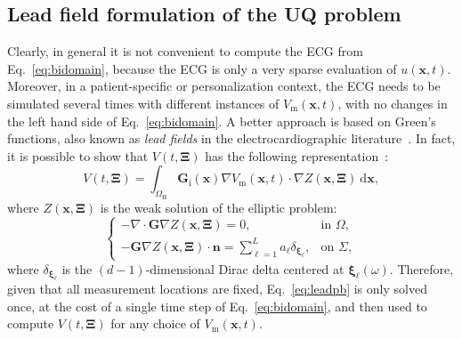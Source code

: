 \documentclass[runningheads]{llncs}
\newcommand{\bs}[1]{\boldsymbol{#1}}
\newcommand{\Vm}{V_\mathrm{m}}
\newcommand{\vx}{\mathbf{x}}
\newcommand{\vn}{\mathbf{n}}
\newcommand{\tG}{\mathbf{G}}
\newcommand{\tGi}{\tG_\mathrm{i}}
\newcommand{\R}{\mathbb{R}}
\newcommand{\dd}{\mathrm{d}}
\newcommand{\OmegaH}{\Omega_\mathrm{H}}
\begin{document}
\subsection{Lead field formulation of the UQ problem}
Clearly, in general it is not convenient to compute the ECG from Eq.~\eqref{eq:bidomain},
because the ECG is only a very sparse evaluation of $u(\vx,t)$.  Moreover, in
a patient-specific or personalization context, the ECG needs to be simulated
several times with different instances of $\Vm(\vx,t)$, with no changes in the
left hand side of Eq.~\eqref{eq:bidomain}. A better approach is based on
Green's functions, also known as \emph{lead fields} in the
electrocardiographic literature~\cite{potse2018}. In fact, it is possible to
show that $V(t,{\bs\Xi})$ has the following representation~\cite{colli2014}:
\begin{equation}\label{eq:ecglead}
V(t,{\bs\Xi}) = \int_{\OmegaH} \tGi(\vx)\nabla\Vm(\vx,t) \cdot\nabla Z(\vx,{\bs\Xi})
\:\dd{\vx},
\end{equation}
where $Z(\vx,{\bs\Xi})$ is the weak solution of the elliptic problem:
\begin{equation}\label{eq:leadpb}
\begin{cases}
-\nabla\cdot\tG\nabla Z(\vx,{\bs\Xi}) = 0, & \text{in }\Omega, \\
-\tG\nabla Z(\vx,{\bs\Xi})\cdot \vn = \sum_{\ell=1}^L a_\ell \delta_{{\bs\xi}_\ell},
& \text{on }\Sigma,
\end{cases}
\end{equation}
where $\delta_{{\bs\xi}_\ell}$ is the $(d-1)$-dimensional Dirac delta centered
at ${\bs\xi}_\ell(\omega)$. Therefore, given that all measurement locations are fixed,
Eq.~\eqref{eq:leadpb} is only solved once, at the cost of a single time step of
Eq.~\eqref{eq:bidomain}, and then used to compute $V(t,{\bs\Xi})$ for any choice
of $\Vm(\vx,t)$.
\end{document}
